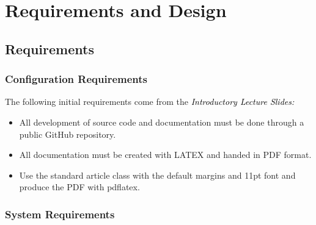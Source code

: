 \documentclass[11pt]{article}
\begin{document}
\newpage
\section{Requirements and Design}
\subsection{Requirements}
\subsubsection{Configuration Requirements}
The following initial requirements come from the \textcolor{black}{\emph{Introductory Lecture Slides:}}\\
\begin{itemize}[noitemsep]
		\item All development of source code and documentation must be
		done through a public GitHub repository. 
		\item All documentation must be created with LATEX and handed in
		PDF format. 
		\item Use the standard article class with the default margins and
		11pt font and produce the PDF with pdflatex.
	\end{itemize}

\subsubsection{System Requirements}
\end{document}
